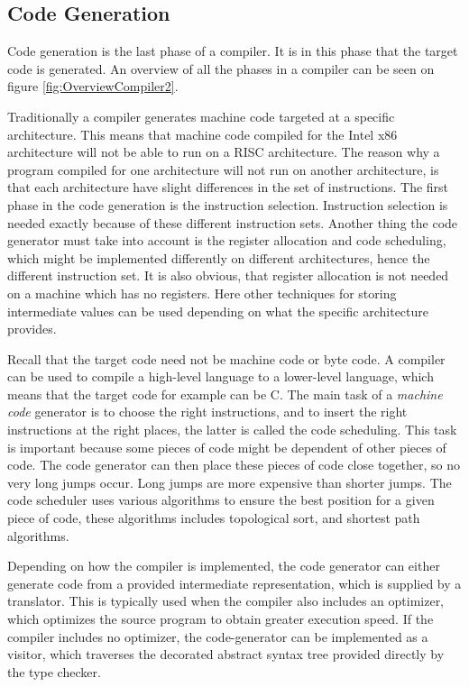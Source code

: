 \subsection{Code Generation}
Code generation is the last phase of a compiler. It is in this phase that the target code is generated. An overview of all the phases in a compiler can be seen on figure \ref{fig:OverviewCompiler2}.

Traditionally a compiler generates machine code targeted at a specific architecture. This means that machine code compiled for the Intel x86 architecture will not be able to run on a RISC architecture. The reason why a program compiled for one architecture will not run on another architecture, is that each architecture have slight differences in the set of instructions. The first phase in the code generation is the instruction selection. Instruction selection is needed exactly because of these different instruction sets. Another thing the code generator must take into account is the register allocation and code scheduling, which might be implemented differently on different architectures, hence the different instruction set. It is also obvious, that register allocation is not needed on a machine which has no registers. Here other techniques for storing intermediate values can be used depending on what the specific architecture provides.

Recall that the target code need not be machine code or byte code. A compiler can be used to compile a high-level language to a lower-level language, which means that the target code for example can be C. The main task of a \emph{machine code} generator is to choose the right instructions, and to insert the right instructions at the right places, the latter is called the code scheduling. This task is important because some pieces of code might be dependent of other pieces of code. The code generator can then place these pieces of code close together, so no very long jumps occur. Long jumps are more expensive than shorter jumps. The code scheduler uses various algorithms to ensure the best position for a given piece of code, these algorithms includes topological sort, and shortest path algorithms.

Depending on how the compiler is implemented, the code generator can either generate code from a provided intermediate representation, which is supplied by a translator. This is typically used when the compiler also includes an optimizer, which optimizes the source program to obtain greater execution speed. If the compiler includes no optimizer, the code-generator can be implemented as a visitor, which traverses the decorated abstract syntax tree provided directly by the type checker.